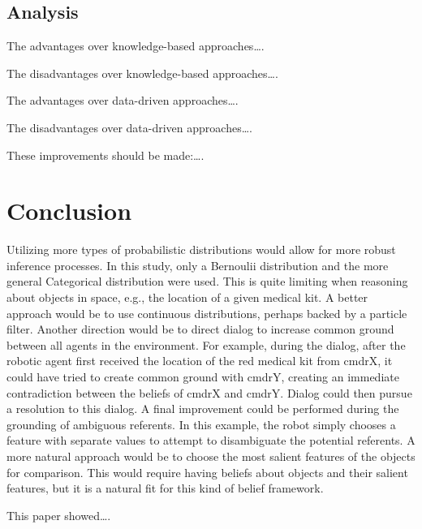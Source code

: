 \documentclass[12pt]{article}
\begin{document}
\subsection{Analysis}
\label{sec:analysis}
The advantages over knowledge-based approaches\dots.

The disadvantages over knowledge-based approaches\dots.

The advantages over data-driven approaches\dots.

The disadvantages over data-driven approaches\dots.

These improvements should be made:\dots.
\section{Conclusion}
\label{sec:conclusion}
Utilizing more types of probabilistic distributions would allow for
more robust inference processes. In this study, only a Bernoulii
distribution and the more general Categorical distribution were
used. This is quite limiting when reasoning about objects in space,
e.g., the location of a given medical kit. A better approach would be
to use continuous distributions, perhaps backed by a particle filter.
Another direction would be to direct dialog to increase common
ground between all agents in the environment. For example, during the
dialog, after the robotic agent first received the location of the
red medical kit from cmdrX, it could have tried to create common
ground with cmdrY, creating an immediate contradiction between the
beliefs of cmdrX and cmdrY. Dialog could then pursue a resolution to
this dialog. A final improvement could be performed during the
grounding of ambiguous referents. In this example, the robot simply
chooses a feature with separate values to attempt to disambiguate the
potential referents. A more natural approach would be to choose the
most salient features of the objects for comparison. This would
require having beliefs about objects and their salient features, but
it is a natural fit for this kind of belief framework.

This paper showed\dots.
 {\small }
\end{document}
